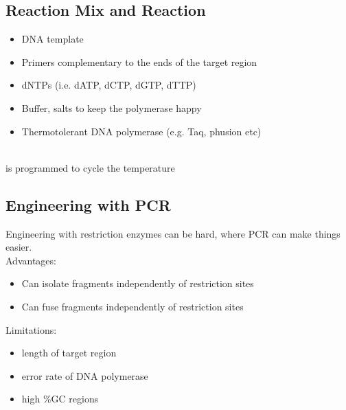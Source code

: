 \subsection{Reaction Mix and Reaction}
\begin{itemize}
    \item DNA template
    \item Primers complementary to the ends of the target region
    \item dNTPs (i.e. dATP, dCTP, dGTP, dTTP)
    \item Buffer, salts to keep the polymerase happy
    \item Thermotolerant DNA polymerase (e.g. Taq, phusion etc)
\end{itemize}
\\[.1in]
 is programmed to cycle the temperature
\subsection{Engineering with PCR}
Engineering with restriction enzymes can be hard, where PCR can make things easier.\\[.2in]
Advantages:
\begin{itemize}
    \item Can isolate fragments independently of restriction sites
    \item Can fuse fragments independently of restriction sites
\end{itemize}
Limitations:
\begin{itemize}
    \item length of target region
    \item error rate of DNA polymerase
    \item high \%GC regions
\end{itemize}
